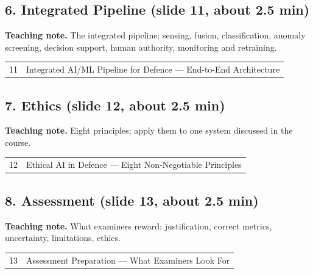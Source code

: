 \documentclass[11pt]{article}
\begin{document}
\subsection{6. Integrated Pipeline \normalfont\small\color{GreyN}(slide 11, about 2.5 min)}

\textbf{Teaching note.} The integrated pipeline: sensing, fusion, classification, anomaly screening, decision support, human authority, monitoring and retraining.

\begin{center}\small\renewcommand{\arraystretch}{1.1}\begin{tabularx}{\textwidth}{@{}r X@{}}11 & Integrated AI/ML Pipeline for Defence --- End-to-End Architecture\\\end{tabularx}\end{center}

\subsection{7. Ethics \normalfont\small\color{GreyN}(slide 12, about 2.5 min)}

\textbf{Teaching note.} Eight principles; apply them to one system discussed in the course.

\begin{center}\small\renewcommand{\arraystretch}{1.1}\begin{tabularx}{\textwidth}{@{}r X@{}}12 & Ethical AI in Defence --- Eight Non-Negotiable Principles\\\end{tabularx}\end{center}

\subsection{8. Assessment \normalfont\small\color{GreyN}(slide 13, about 2.5 min)}

\textbf{Teaching note.} What examiners reward: justification, correct metrics, uncertainty, limitations, ethics.

\begin{center}\small\renewcommand{\arraystretch}{1.1}\begin{tabularx}{\textwidth}{@{}r X@{}}13 & Assessment Preparation --- What Examiners Look For\\\end{tabularx}\end{center}
\end{document}
